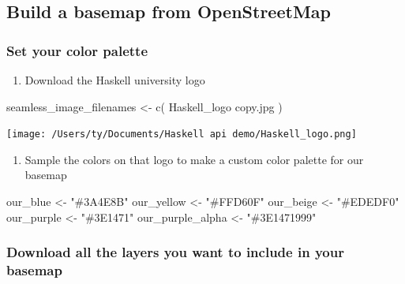\documentclass[
  paper=a4,
  ,captions=tableheading
]{scrartcl}
\newenvironment{Shaded}{\begin{snugshade}}{\end{snugshade}}
\newcommand{\FunctionTok}[1]{\textcolor[rgb]{0.00,0.00,0.00}{#1}}
\newcommand{\NormalTok}[1]{#1}
\newcommand{\OtherTok}[1]{\textcolor[rgb]{0.56,0.35,0.01}{#1}}
\newcommand{\StringTok}[1]{\textcolor[rgb]{0.31,0.60,0.02}{#1}}
\providecommand{\tightlist}{%
  \setlength{\itemsep}{0pt}\setlength{\parskip}{0pt}}
\begin{document}
\hypertarget{build-a-basemap-from-openstreetmap}{%
\subsection{Build a basemap from
OpenStreetMap}\label{build-a-basemap-from-openstreetmap}}

\hypertarget{set-your-color-palette}{%
\subsubsection{Set your color palette}\label{set-your-color-palette}}

\begin{enumerate}
\def\labelenumi{\arabic{enumi}.}
\tightlist
\item
  Download the Haskell university logo
\end{enumerate}

\begin{Shaded}
\begin{Highlighting}[]
\NormalTok{seamless\_image\_filenames }\OtherTok{\textless{}{-}} \FunctionTok{c}\NormalTok{(}
  \StringTok{\textquotesingle{}Haskell\_logo copy.jpg\textquotesingle{}}
\NormalTok{)}
\end{Highlighting}
\end{Shaded}

\texttt{[image: /Users/ty/Documents/Haskell api demo/Haskell\_logo.png]}

\begin{enumerate}
\def\labelenumi{\arabic{enumi}.}
\setcounter{enumi}{1}
\tightlist
\item
  Sample the colors on that logo to make a custom color palette for our
  basemap
\end{enumerate}

\begin{Shaded}
\begin{Highlighting}[]
\NormalTok{our\_blue }\OtherTok{\textless{}{-}} \StringTok{"\#3A4E8B"}
\NormalTok{our\_yellow }\OtherTok{\textless{}{-}} \StringTok{"\#FFD60F"}
\NormalTok{our\_beige }\OtherTok{\textless{}{-}} \StringTok{"\#EDEDF0"}
\NormalTok{our\_purple }\OtherTok{\textless{}{-}} \StringTok{"\#3E1471"}
\NormalTok{our\_purple\_alpha }\OtherTok{\textless{}{-}} \StringTok{"\#3E1471999"}
\end{Highlighting}
\end{Shaded}

\hypertarget{download-all-the-layers-you-want-to-include-in-your-basemap}{%
\subsubsection{Download all the layers you want to include in your
basemap}\label{download-all-the-layers-you-want-to-include-in-your-basemap}}
\end{document}
